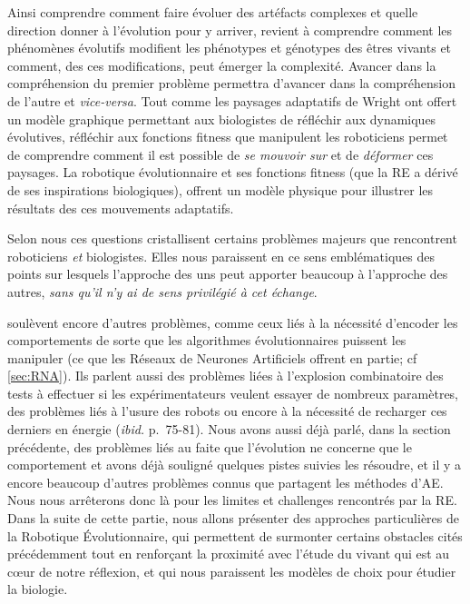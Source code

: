 Ainsi comprendre comment faire évoluer des artéfacts complexes et quelle direction donner à l'évolution pour y arriver, revient à comprendre comment les phénomènes évolutifs modifient les phénotypes et génotypes des êtres vivants et comment, des ces modifications, peut émerger la complexité. Avancer dans la compréhension du premier problème permettra d'avancer dans la compréhension de l'autre et \emph{vice-versa}.
Tout comme les paysages adaptatifs de Wright ont offert un modèle graphique permettant aux biologistes de réfléchir aux dynamiques évolutives, réfléchir aux fonctions fitness que manipulent les roboticiens permet de comprendre comment il est possible de \emph{se mouvoir sur} et de \emph{déformer} ces paysages. La robotique évolutionnaire et ses fonctions fitness (que la RE a dérivé de ses inspirations biologiques), offrent un modèle physique pour illustrer les résultats des ces mouvements adaptatifs.

Selon nous ces questions cristallisent certains problèmes majeurs que rencontrent roboticiens \emph{et} biologistes. Elles nous paraissent en ce sens emblématiques des points sur lesquels l'approche des uns peut apporter beaucoup à l'approche des autres, \emph{sans qu'il n'y ai de sens privilégié à cet échange}.

\cite{mataric96challengesinevolvingcontrollersforphysicalrobots} soulèvent encore d'autres problèmes, comme ceux liés à la nécessité d'encoder les comportements de sorte que les algorithmes évolutionnaires puissent les manipuler (ce que les Réseaux de Neurones Artificiels offrent en partie; cf \ref{sec:RNA}). Ils parlent aussi des problèmes liées à l'explosion combinatoire des tests à effectuer si les expérimentateurs veulent essayer de nombreux paramètres, des problèmes liés à l'usure des robots ou encore à la nécessité de recharger ces derniers en énergie (\emph{ibid.} p.~75-81).  Nous avons aussi déjà parlé, dans la section précédente, des problèmes liés au faite que l'évolution ne concerne que le comportement et avons déjà souligné quelques pistes suivies les résoudre, et il y a encore beaucoup d'autres problèmes connus que partagent les méthodes d'AE. Nous nous arrêterons donc là pour les limites et challenges rencontrés par la RE.
Dans la suite de cette partie, nous allons présenter des approches particulières de la Robotique \'Evolutionnaire, qui permettent de surmonter certains obstacles cités précédemment tout en renforçant la proximité avec l'étude du vivant qui est au c{\oe}ur de notre réflexion, et qui nous paraissent les modèles de choix pour étudier la biologie.

